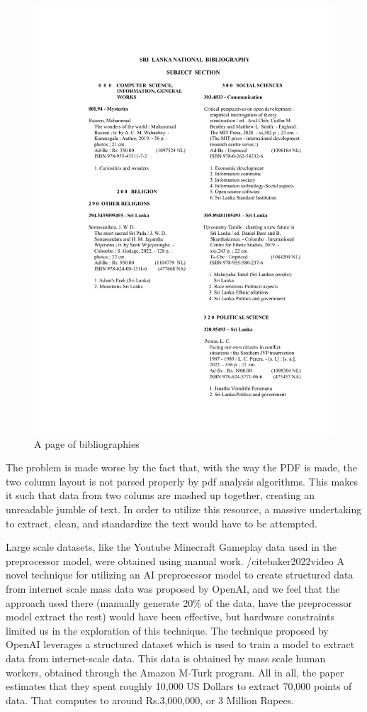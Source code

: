 \begin{figure}[htbp]
    \centering
    \includegraphics[width=1\textwidth]{../../assets/slnb_june_pg47.png}
    \caption{A page of bibliographies}
    \label{fig:slnbpage}
\end{figure}

The problem is made worse by the fact that, with the way the PDF is made, the two column layout is not parsed properly by pdf analysis algorithms. This makes it such that data from two colums are mashed up together, creating an unreadable jumble of text. In order to utilize this resource, a massive undertaking to extract, clean, and standardize the text would have to be attempted.

Large scale datasets, like the Youtube Minecraft Gameplay data used in the preprocessor model, were obtained using manual work. /cite{baker2022video}  A novel technique for utilizing an AI preprocessor model to create structured data from internet scale mass data was proposed by OpenAI, and we feel that the approach used there (manually generate 20\% of the data, have the preprocessor model extract the rest) would have been effective, but hardware constraints limited us in the exploration of this technique.
The technique proposed by OpenAI \cite{baker2022video} leverages a structured dataset which is used to train a model to extract data from internet-scale data. This data is obtained by mass scale human workers, obtained through the Amazon M-Turk program. All in all, the paper estimates that they spent roughly 10,000 US Dollars to extract 70,000 points of data. That computes to around Rs.3,000,000, or 3 Million Rupees.

